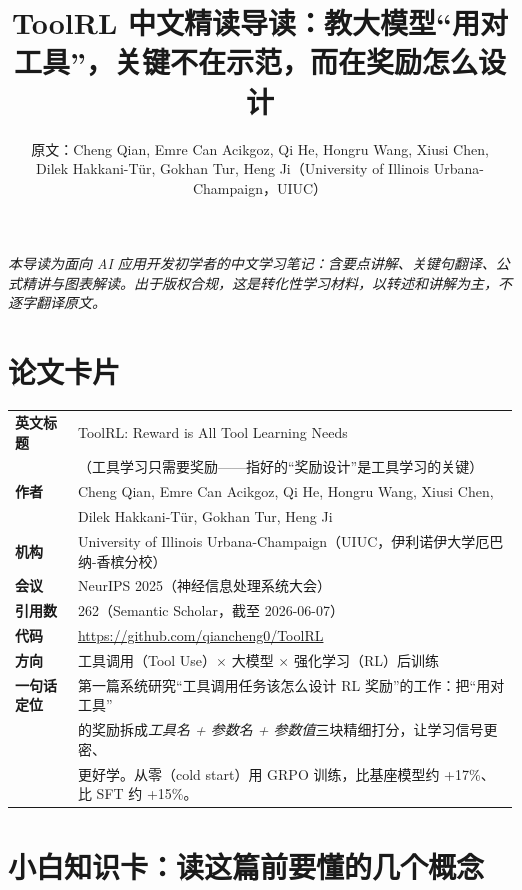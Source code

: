 \documentclass[11pt,UTF8,fontset=fandol]{ctexart}
\title{\textbf{ToolRL 中文精读导读：教大模型“用对工具”，关键不在示范，而在奖励怎么设计}}
\author{原文：Cheng Qian, Emre Can Acikgoz, Qi He, Hongru Wang, Xiusi Chen,\\ Dilek Hakkani-Tür, Gokhan Tur, Heng Ji（University of Illinois Urbana-Champaign，UIUC）}
\date{}
\begin{document}
\maketitle
\begin{center}\small\textit{本导读为面向 AI 应用开发初学者的中文学习笔记：含要点讲解、关键句翻译、公式精讲与图表解读。出于版权合规，这是转化性学习材料，以转述和讲解为主，不逐字翻译原文。}\end{center}

\section*{论文卡片}
\begin{center}
\begin{tabular}{@{}ll@{}}
\toprule
\textbf{英文标题} & ToolRL: Reward is All Tool Learning Needs \\
            & （工具学习只需要奖励——指好的“奖励设计”是工具学习的关键） \\
\textbf{作者} & Cheng Qian, Emre Can Acikgoz, Qi He, Hongru Wang, Xiusi Chen, \\
            & Dilek Hakkani-Tür, Gokhan Tur, Heng Ji \\
\textbf{机构} & University of Illinois Urbana-Champaign（UIUC，伊利诺伊大学厄巴纳-香槟分校） \\
\textbf{会议} & NeurIPS 2025（神经信息处理系统大会） \\
\textbf{引用数} & 262（Semantic Scholar，截至 2026-06-07） \\
\textbf{代码} & \url{https://github.com/qiancheng0/ToolRL} \\
\textbf{方向} & 工具调用（Tool Use）$\times$ 大模型 $\times$ 强化学习（RL）后训练 \\
\textbf{一句话定位} & 第一篇系统研究“工具调用任务该怎么设计 RL 奖励”的工作：把“用对工具”\\
              & 的奖励拆成\emph{工具名 + 参数名 + 参数值}三块精细打分，让学习信号更密、\\
              & 更好学。从零（cold start）用 GRPO 训练，比基座模型约 +17\%、比 SFT 约 +15\%。 \\
\bottomrule
\end{tabular}
\end{center}

\section{小白知识卡：读这篇前要懂的几个概念}
\end{document}
